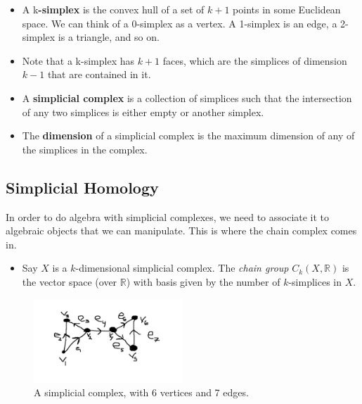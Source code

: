 \documentclass[12pt]{article}
\begin{document}
\begin{itemize}

\item A k\textbf{-simplex} is the convex hull of a set of $k+1$ points in some Euclidean space. We can think of a 0-simplex as a
  vertex. A 1-simplex is an edge, a 2-simplex is a triangle, and so on. 

\item Note that a k-simplex has $k+1$ faces, which are the simplices of dimension $k-1$ that are
  contained in it.

\item A \textbf{simplicial complex} is a collection of simplices such that the intersection of any two simplices is either empty or
another simplex.

\item The \textbf{dimension} of a simplicial complex is the maximum dimension of any of the simplices in the complex. 

\end{itemize}

\subsection{Simplicial Homology}

In order to do algebra with simplicial complexes, we need to associate it to algebraic objects that
we can manipulate. This is where the chain complex comes in.

\begin{itemize}

  \item Say $X$ is a $k$-dimensional simplicial complex. The \textit{chain group} $C_k(X,
    \mathbb{R})$ is the vector space (over $\mathbb{R}$) with basis given by the number of
    $k$-simplices in $X$. 

\end{itemize}

\begin{figure}[ht]
  \begin{center}
      \includegraphics[width=0.5\textwidth]{Simp_Cx.jpg}
  \end{center}
\caption{A simplicial complex, with 6 vertices and 7 edges.}
\end{figure}
\end{document}

